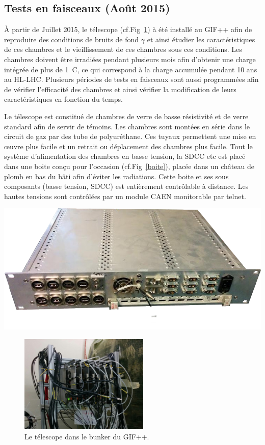 \subsection{Tests en faisceaux (Août 2015)}
À partir de Juillet 2015, le télescope (cf.Fig~\ref{GIFppChambers}) à été installé au GIF++ afin de reproduire des conditions de bruits de fond $\gamma$ et ainsi étudier les caractéristiques de ces chambres et le vieillissement de ces chambres sous ces conditions. Les chambres doivent être irradiées pendant plusieurs mois afin d'obtenir une charge intégrée de plus de \SI{1}{\coulomb}, ce qui correspond à la charge accumulée pendant \num{10} ans au HL-LHC.
Plusieurs périodes de tests en faisceaux sont aussi programmées afin de vérifier l'efficacité des chambres et ainsi vérifier la modification de leurs caractéristiques en fonction du temps.

Le télescope est constitué de chambres de verre de basse résistivité et de verre standard afin de servir de témoins. Les chambres sont montées en série dans le circuit de gaz par des tube de polyuréthane. Ces tuyaux permettent une mise en œuvre plus facile et un retrait ou déplacement des chambres plus facile. Tout le système d'alimentation des chambres en basse tension, la SDCC etc est placé dans une boite conçu pour l'occasion (cf.Fig~\ref{boite}), placée dans un château de plomb en bas du bâti afin d'éviter les radiations. Cette boite et ses sous composants (basse tension, SDCC) est entièrement contrôlable à distance. Les hautes tensions sont contrôlées par un module CAEN monitorable par telnet.

\marginpar
{
	\centering
	\includegraphics[width=1.0\marginparwidth]{GLA/boite.png}
	\label{boite}
}

\begin{figure}[!ht]
	\centering
	\includegraphics[width=0.55\textwidth]{GLA/GIFppChambers.png}
	\caption{Le télescope dans le bunker du GIF++.}
	\label{GIFppChambers}
\end{figure}

